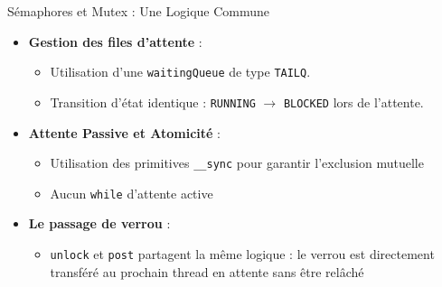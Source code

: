 \begin{frame}{Sémaphores et Mutex : Une Logique Commune}
    

    \begin{itemize}
        \item \textbf{Gestion des files d'attente} :
            \begin{itemize}
                \item Utilisation d'une \texttt{waitingQueue} de type \texttt{TAILQ}.
                \item Transition d'état identique : \texttt{RUNNING} $\rightarrow$ \texttt{BLOCKED} lors de l'attente.
            \end{itemize}
        \item \textbf{Attente Passive et Atomicité} :
            \begin{itemize}
                \item Utilisation des primitives \texttt{\_\_sync} pour garantir l'exclusion mutuelle
                \item Aucun \texttt{while} d'attente active
            \end{itemize}
        \item \textbf{Le passage de verrou} :
            \begin{itemize}
                \item \texttt{unlock} et \texttt{post} partagent la même logique : le verrou est directement transféré au prochain thread en attente sans être relâché
            \end{itemize}
    \end{itemize}
\end{frame}

